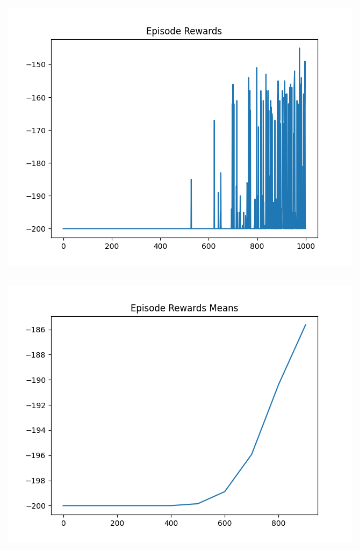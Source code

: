 \begin{figure}[H]
    \centering
    \begin{subfigure}{.47\linewidth}
        \centering
        \includegraphics[width=\textwidth]{mountain/2024-06-15_12-43-26_dqn_mountaincar_episode_rewards.png}
    \end{subfigure}
    \begin{subfigure}{.47\linewidth}
        \centering
        \includegraphics[width=\textwidth]{mountain/2024-06-15_12-43-26_dqn_mountaincar_episode_rewards_means.png}
    \end{subfigure}
    \begin{subfigure}{.47\linewidth}
        \centering

\end{subfigure}
\end{figure}
